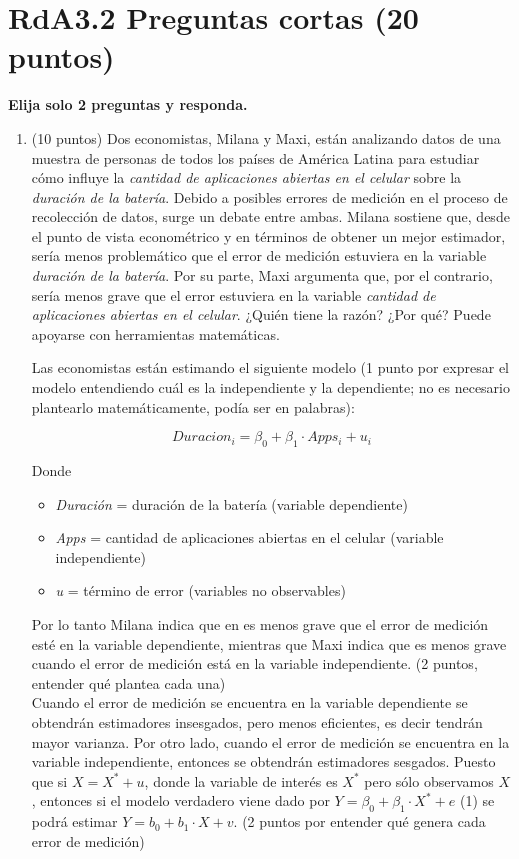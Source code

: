 \documentclass[10pt,a4paper]{article}
\begin{document}
\section{RdA3.2  Preguntas cortas (20 puntos)}
{\bf Elija solo 2 preguntas y responda. }
\begin{enumerate}
    \item (10 puntos) Dos economistas, Milana y Maxi, están analizando datos de una muestra de personas de todos los países de América Latina para estudiar cómo influye la \textit{cantidad de aplicaciones abiertas en el celular} sobre la \textit{duración de la batería}. 
    Debido a posibles errores de medición en el proceso de recolección de datos, surge un debate entre ambas. Milana sostiene que, desde el punto de vista econométrico y en términos de obtener un mejor estimador, sería menos problemático que el error de medición estuviera en la variable \textit{duración de la batería}. Por su parte, Maxi argumenta que, por el contrario, sería menos grave que el error estuviera en la variable \textit{cantidad de aplicaciones abiertas en el celular}. ¿Quién tiene la razón? ¿Por qué? Puede apoyarse con herramientas matemáticas.

{\color{blue}
     Las economistas están estimando el siguiente modelo (1 punto por expresar el modelo entendiendo cuál es la independiente y la dependiente; no es necesario plantearlo matemáticamente, podía ser en palabras):

    $$Duracion_i = \beta_0 + \beta_1 \cdot Apps_i + u_i$$

    Donde
    \begin{itemize}
        \item \textit{Duración} = duración de la batería (variable dependiente)
        \item \textit{Apps} = cantidad de aplicaciones abiertas en el celular (variable independiente)
        \item \textit{u} = término de error (variables no observables)
    \end{itemize}

    Por lo tanto Milana indica que en es menos grave que el error de medición esté en la variable dependiente, mientras que Maxi indica que es menos grave cuando el error de medición está en la variable independiente. (2 puntos, entender qué plantea cada una) \\
    Cuando el error de medición se encuentra en la variable dependiente se obtendrán estimadores insesgados, pero menos eficientes, es decir tendrán mayor varianza. Por otro lado, cuando el error de medición se encuentra en la variable independiente, entonces se obtendrán estimadores sesgados. Puesto que si $X = X^* + u$, donde la variable de interés es $X^*$ pero sólo observamos $X$, entonces si el modelo verdadero viene dado por $Y = \beta_0 + \beta_1 \cdot X^* + e$ (1) se podrá estimar $Y = b_0 + b_1 \cdot X + v$. (2 puntos por entender qué genera cada error de medición)\\

}
\end{enumerate}
\end{document}
